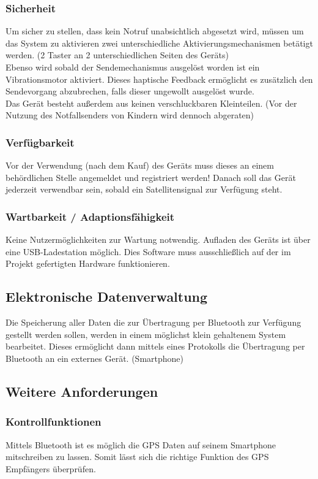 \subsubsection{Sicherheit}
Um sicher zu stellen, dass kein Notruf unabsichtlich abgesetzt wird, müssen um das System zu aktivieren zwei unterschiedliche Aktivierungsmechanismen betätigt werden. (2 Taster an 2 unterschiedlichen Seiten des Geräts)\\
Ebenso wird sobald der Sendemechanismus ausgelöst worden ist ein Vibrationsmotor aktiviert. Dieses haptische Feedback
ermöglicht es zusätzlich den Sendevorgang abzubrechen, falls dieser ungewollt ausgelöst wurde.\\
Das Gerät besteht außerdem aus keinen verschluckbaren Kleinteilen. (Vor der Nutzung des Notfallsenders von Kindern wird dennoch abgeraten) 
\subsubsection{Verfügbarkeit}
Vor der Verwendung (nach dem Kauf) des Geräts muss dieses an einem behördlichen Stelle angemeldet und 
registriert werden!
Danach soll das Gerät jederzeit verwendbar sein, sobald ein Satellitensignal zur Verfügung steht.
\subsubsection{Wartbarkeit / Adaptionsfähigkeit}
Keine Nutzermöglichkeiten zur Wartung notwendig.
Aufladen des Geräts ist über eine USB-Ladestation möglich.
Dies Software muss ausschließlich auf der im Projekt gefertigten Hardware funktionieren.

\subsection{Elektronische Datenverwaltung}
Die Speicherung aller Daten die zur Übertragung per Bluetooth zur Verfügung gestellt werden sollen, werden in 
einem möglichst klein gehaltenem System bearbeitet. Dieses ermöglicht dann mittels eines Protokolls die Übertragung per Bluetooth an ein externes Gerät. (Smartphone)

\subsection{Weitere Anforderungen}
\subsubsection{Kontrollfunktionen}
Mittels Bluetooth ist es möglich die GPS Daten auf seinem Smartphone mitschreiben zu lassen.
Somit lässt sich die richtige Funktion des GPS Empfängers überprüfen.
